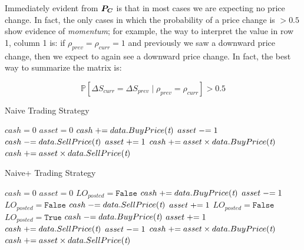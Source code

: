 \vspace{0.5cm}
Immediately evident from $\boldsymbol{P_C}$ is that in most cases we are expecting no price change. In fact, the only cases in which the probability of a price change is $>0.5$ show evidence of \textit{momentum}; for example, the way to interpret the value in row 1, column 1 is: if $\rho_{prev} = \rho_{curr} = 1$ and previously we saw a downward price change, then we expect to again see a downward price change. In fact, the best way to summarize the matrix is:

$$ \mathbb{P} \left[ \Delta S_{curr} = \Delta S_{prev} \; | \; \rho_{prev} = \rho_{curr} \right] > 0.5 $$

\begin{algorithm}
\caption{Naive Trading Strategy}
\begin{algorithmic}[1]
\State $cash = 0$
\State $asset = 0$
		\State $cash \mathrel{+}= data.BuyPrice(\textit{t})$
		\State $asset \mathrel{-}= 1$
		\State $cash \mathrel{-}= data.SellPrice(\textit{t})$	
		\State $asset \mathrel{+}= 1$
	\EndIf
\EndFor
{} 
	\State $cash \mathrel{+}= asset \times data.BuyPrice(\textit{t})$
	\State $cash \mathrel{+}= asset \times data.SellPrice(\textit{t})$	
\EndIf
\end{algorithmic}
\end{algorithm}

\begin{algorithm}
\caption{Naive+ Trading Strategy}
\begin{algorithmic}[1]
\State $cash = 0$
\State $asset = 0$
\State $LO_{posted} = \texttt{False}$
		\State $cash \mathrel{+}= data.BuyPrice(\textit{t})$
		\State $asset \mathrel{-}= 1$
		\State $LO_{posted} = \texttt{False}$
		\State $cash \mathrel{-}= data.SellPrice(\textit{t})$	
		\State $asset \mathrel{+}= 1$
		\State $LO_{posted} = \texttt{False}$
		\State $LO_{posted} = \texttt{True}$
	\EndIf
				\State $cash \mathrel{-}= data.BuyPrice(\textit{t})$	
				\State $asset \mathrel{+}= 1$
				\State $cash \mathrel{+}= data.SellPrice(\textit{t})$
				\State $asset \mathrel{-}= 1$
			\EndIf
		\EndFor
	\EndIf
\EndFor
{} 
\State $cash \mathrel{+}= asset \times data.BuyPrice(\textit{t})$
\State $cash \mathrel{+}= asset \times data.SellPrice(\textit{t})$	
\EndIf
\end{algorithmic}
\end{algorithm}

